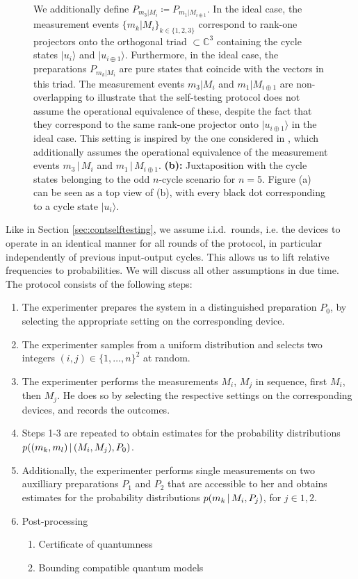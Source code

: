 \begin{figure}
{\vspace*{0.7em} 
We additionally define $P_{m_3\vert M_i}\coloneqq P_{m_1\vert M_{i\oplus 1}}$. In the ideal case, the measurement events $\{m_k\vert M_i\}_{k\in\{1,2,3\}}$ correspond to rank-one projectors onto the orthogonal triad $\subset \mathbb{C}^3$ containing the cycle states $\vert u_i\rangle$ and $\vert u_{i\oplus 1}\rangle$. Furthermore, in the ideal case, the preparations $P_{m_k\vert M_i}$ are pure states that coincide with the vectors in this triad. The measurement events $m_3\vert M_i$ and $m_1\vert M_{i\oplus 1}$ are non-overlapping to illustrate that the self-testing protocol does not assume the operational equivalence of these, despite the fact that they correspond to the same rank-one projector onto $\vert u_{i\oplus 1}\rangle$ in the ideal case. This setting is inspired by the one considered in \cite{Kunjwal2019}, which additionally assumes the operational equivalence of the measurement events $m_3\,\vert\, M_i$ and $m_1\,\vert\, M_{i\oplus 1}$. \textbf{(b):} Juxtaposition with the cycle states belonging to the odd $n$-cycle scenario for $n=5$. Figure (a) can be seen as a top view of (b), with every black dot corresponding to a cycle state $\vert u_i\rangle$.
}
\label{fig:ncycleselftesting}
\end{figure}

Like in Section \ref{sec:contselftesting}, we assume i.i.d.\ rounds, i.e. the devices to operate in an identical manner for all rounds of the protocol, in particular independently of previous input-output cycles. This allows us to lift relative frequencies to probabilities. We will discuss all other assumptions in due time. The protocol consists of the following steps:
\begin{enumerate}
\item The experimenter prepares the system in a distinguished preparation $P_0$, by selecting the appropriate setting on the corresponding device.
\item The experimenter samples from a uniform distribution and selects two integers $(i,j)\in\{1,\dots,n\}^2$ at random.
\item The experimenter performs the measurements $M_i$, $M_j$ in sequence, first $M_i$, then $M_j$. He does so by selecting the respective settings on the corresponding devices, and records the outcomes.
\item Steps 1-3 are repeated to obtain estimates for the probability distributions \\ $p((m_k,m_l)\thinspace\vert\thinspace (M_i,M_j),P_0)$. 
\item Additionally, the experimenter performs single measurements on two auxilliary preparations $P_1$ and $P_2$ that are accessible to her and obtains estimates for the probability distributions $p(m_k\thinspace\vert\thinspace M_i, P_j)$, for $j\in{1,2}$.
\item Post-processing
	\begin{enumerate}
	\item Certificate of quantumness
	\item Bounding compatible quantum models
	\end{enumerate}
\end{enumerate}

